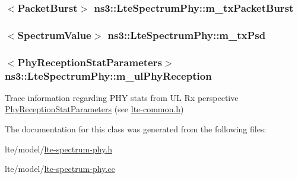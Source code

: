 \subsubsection[{\texorpdfstring{m\+\_\+tx\+Packet\+Burst}{m_txPacketBurst}}]{$<${\bf Packet\+Burst}$>$ ns3\+::\+Lte\+Spectrum\+Phy\+::m\+\_\+tx\+Packet\+Burst\hspace{0.3cm}{\ttfamily [private]}}\hypertarget{classns3_1_1LteSpectrumPhy_a9f77709c77cf2b1bcae046b9bc136631}{}\label{classns3_1_1LteSpectrumPhy_a9f77709c77cf2b1bcae046b9bc136631}
\subsubsection[{\texorpdfstring{m\+\_\+tx\+Psd}{m_txPsd}}]{$<${\bf Spectrum\+Value}$>$ ns3\+::\+Lte\+Spectrum\+Phy\+::m\+\_\+tx\+Psd\hspace{0.3cm}{\ttfamily [private]}}\hypertarget{classns3_1_1LteSpectrumPhy_a5db966e9422290886f779dbbf1cbd146}{}\label{classns3_1_1LteSpectrumPhy_a5db966e9422290886f779dbbf1cbd146}
\subsubsection[{\texorpdfstring{m\+\_\+ul\+Phy\+Reception}{m_ulPhyReception}}]{$<${\bf Phy\+Reception\+Stat\+Parameters}$>$ ns3\+::\+Lte\+Spectrum\+Phy\+::m\+\_\+ul\+Phy\+Reception\hspace{0.3cm}{\ttfamily [private]}}\hypertarget{classns3_1_1LteSpectrumPhy_ac86744120540d5bd999d11f3ac452de4}{}\label{classns3_1_1LteSpectrumPhy_ac86744120540d5bd999d11f3ac452de4}
Trace information regarding P\+HY stats from UL Rx perspective \hyperlink{structns3_1_1PhyReceptionStatParameters}{Phy\+Reception\+Stat\+Parameters} (see \hyperlink{lte-common_8h}{lte-\/common.\+h}) 

The documentation for this class was generated from the following files\+:\begin{DoxyCompactItemize}
\item 
lte/model/\hyperlink{lte-spectrum-phy_8h}{lte-\/spectrum-\/phy.\+h}\item 
lte/model/\hyperlink{lte-spectrum-phy_8cc}{lte-\/spectrum-\/phy.\+cc}\end{DoxyCompactItemize}
